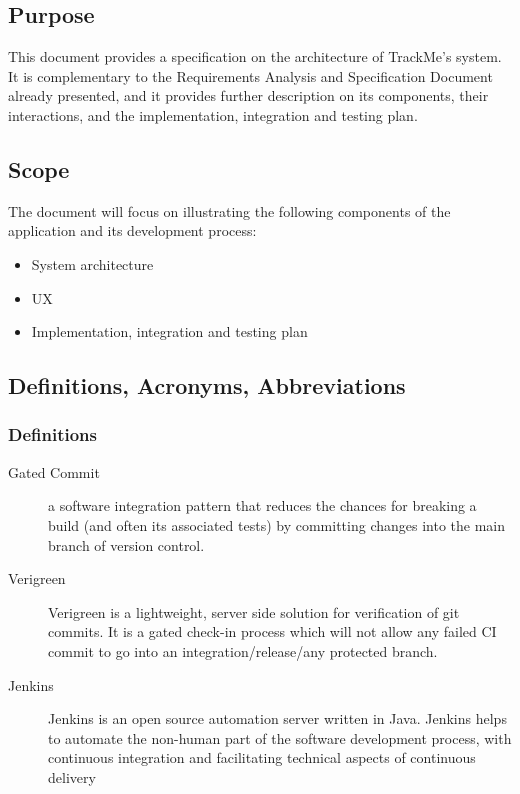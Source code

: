 \documentclass[../main.tex]{subfiles}
\begin{document}
\subsection{Purpose}

This document provides a specification on the architecture of TrackMe's system. It is complementary to the Requirements Analysis and Specification Document already presented, and it provides further description on its components, their interactions, and the implementation, integration and testing plan.

\subsection{Scope}

The document will focus on illustrating the following components of the application and its development process:

\begin{itemize}

	\item{System architecture}
	\item{UX}
	\item{Implementation, integration and testing plan}

\end{itemize}

\subsection{Definitions, Acronyms, Abbreviations}
	

	\subsubsection{Definitions}
		\begin{description}
			\item[Gated Commit] a software integration pattern that reduces the chances for breaking a build (and often its associated tests) by committing changes into the main branch of version control.
			\item[Verigreen] Verigreen is a lightweight, server side solution for verification of git commits. It is a gated check-in process which will not allow any failed CI commit to go into an integration/release/any protected branch.
			\item[Jenkins]  Jenkins is an open source automation server written in Java. Jenkins helps to automate the non-human part of the software development process, with continuous integration and facilitating technical aspects of continuous delivery
		\end{description}
	
\end{document}
